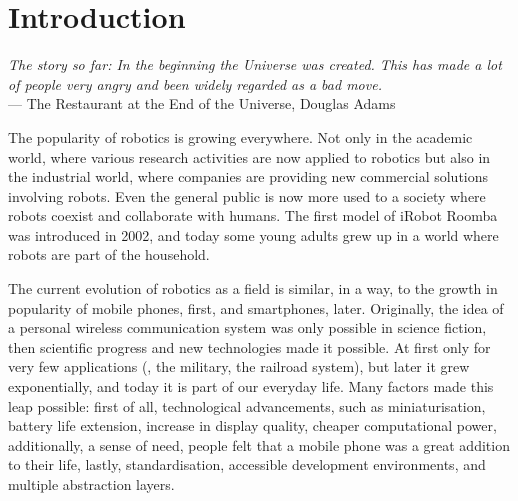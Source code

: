 \chapter{Introduction}\label{ch:introduction}

\begin{flushright}{\slshape The story so far: In the beginning the Universe was created. This has made a lot of people very angry and been widely regarded as a bad move.} \\ \medskip
    ---  The Restaurant at the End of the Universe, Douglas Adams 
\end{flushright}

The popularity of robotics is growing everywhere. Not only in the academic world, where various research activities are now applied to robotics but also in the industrial world, where companies are providing new commercial solutions involving robots. Even the general public is now more used to a society where robots coexist and collaborate with humans. The first model of iRobot Roomba was introduced in 2002, and today some young adults grew up in a world where robots are part of the household.

The current evolution of robotics as a field is similar, in a way, to the growth in popularity of mobile phones, first, and smartphones, later.  Originally, the idea of a personal wireless communication system was only possible in science fiction, then scientific progress and new technologies made it possible. At first only for very few applications (\eg, the military, the railroad system), but later it grew exponentially, and today it is part of our everyday life. Many factors made this leap possible: first of all, technological advancements, such as miniaturisation, battery life extension, increase in display quality, cheaper computational power, additionally, a sense of need, people felt that a mobile phone was a great addition to their life, lastly, standardisation, accessible development environments, and multiple abstraction layers.

